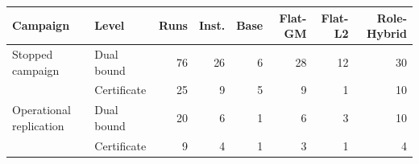\begin{tabular}{llrrrrrr}
\toprule
Campaign & Level & Runs & Inst. & Base & Flat-GM & Flat-L2 & Role-Hybrid \\
\midrule
Stopped campaign & Dual bound & 76 & 26 & 6 & 28 & 12 & 30 \\
 & Certificate & 25 & 9 & 5 & 9 & 1 & 10 \\
Operational replication & Dual bound & 20 & 6 & 1 & 6 & 3 & 10 \\
 & Certificate & 9 & 4 & 1 & 3 & 1 & 4 \\
\bottomrule
\end{tabular}

